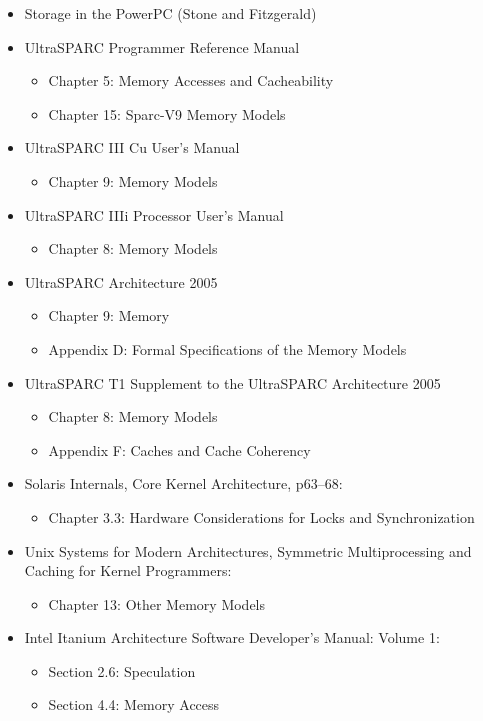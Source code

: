 \begin{itemize}
\item
Storage in the PowerPC (Stone and Fitzgerald)

\item
UltraSPARC Programmer Reference Manual
  \begin{itemize}
    \item
	Chapter 5: Memory Accesses and Cacheability
    \item
	Chapter 15: Sparc-V9 Memory Models
  \end{itemize}

\item
UltraSPARC III Cu User's Manual
  \begin{itemize}
    \item
	Chapter 9: Memory Models
  \end{itemize}

\item
UltraSPARC IIIi Processor User's Manual
  \begin{itemize}
    \item
	Chapter 8: Memory Models
  \end{itemize}

\item
UltraSPARC Architecture 2005
  \begin{itemize}
    \item
	Chapter 9: Memory
    \item
	Appendix D: Formal Specifications of the Memory Models
  \end{itemize}

\item
UltraSPARC T1 Supplement to the UltraSPARC Architecture 2005
  \begin{itemize}
    \item
	Chapter 8: Memory Models
    \item
	Appendix F: Caches and Cache Coherency
  \end{itemize}

\item
Solaris Internals, Core Kernel Architecture, p63--68:
  \begin{itemize}
    \item
	Chapter 3.3: Hardware Considerations for Locks and
			Synchronization
  \end{itemize}

\item
Unix Systems for Modern Architectures, Symmetric Multiprocessing and Caching
for Kernel Programmers:
  \begin{itemize}
    \item
	Chapter 13: Other Memory Models
  \end{itemize}

\item
Intel Itanium Architecture Software Developer's Manual: Volume 1:
  \begin{itemize}
    \item
	Section 2.6: Speculation
    \item
	Section 4.4: Memory Access
  \end{itemize}
\end{itemize}
\endgroup
